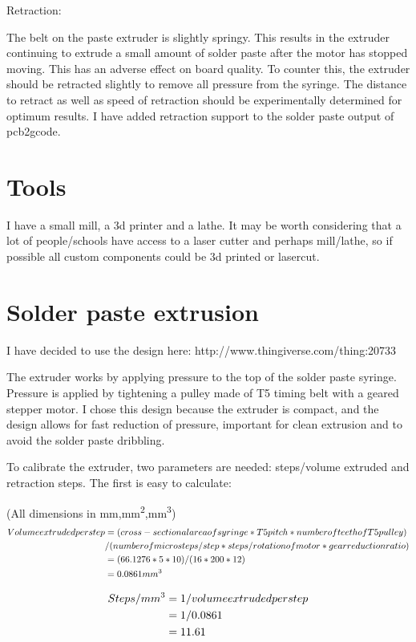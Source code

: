 \documentclass[a4paper,11pt]{article}  %
\begin{document}
Retraction:

The belt on the paste extruder is slightly springy. This results in the extruder continuing to extrude a small amount of solder paste after the motor has stopped moving.
This has an adverse effect on board quality. To counter this, the extruder should be retracted slightly to remove all pressure from the syringe. The distance to retract
as well as speed of retraction should be experimentally determined for optimum results. I have added retraction support to the solder paste output of pcb2gcode.

\section{Tools}
I have a small mill, a 3d printer and a lathe. It may be worth considering that a lot of people/schools have
access to a laser cutter and perhaps mill/lathe, so if possible all custom components could be 3d printed or 
lasercut.

\section{Solder paste extrusion}
I have decided to use the design here: http://www.thingiverse.com/thing:20733

The extruder works by applying pressure to the top of the solder paste syringe. Pressure is applied by tightening a pulley made
of T5 timing belt with a geared stepper motor. I chose this design because the extruder is compact, and the design allows for
fast reduction of pressure, important for clean extrusion and to avoid the solder paste dribbling. 

To calibrate the extruder, two parameters are needed: steps/volume extruded and retraction steps. The first is easy to calculate:

(All dimensions in mm,mm\textsuperscript{2},mm\textsuperscript{3})
\begin{align}
	Volume extruded per step &= (cross-sectional area of syringe * T5 pitch * number of teeth of T5 pulley) \\&/ (number of microsteps/step * steps/rotation of motor * gear reduction ratio)\\
	&= (66.1276*5*10)/(16*200*12)\\
	&= 0.0861 mm\textsuperscript{3}\\
\end{align}

\begin{align}					 
	Steps/mm\textsuperscript{3} &= 1 / volume extruded per step\\
	&= 1 / 0.0861\\
	&= 11.61\\
\end{align}
\end{document}
